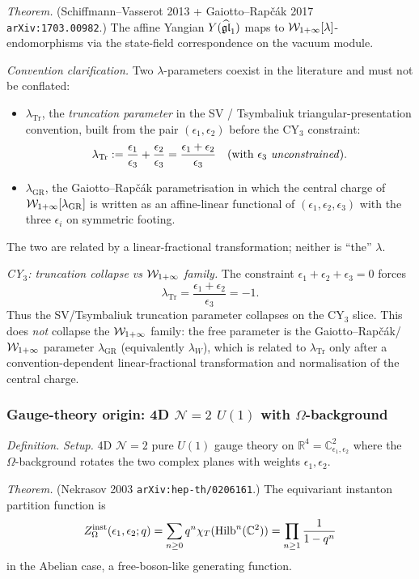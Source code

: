 \emph{Theorem.} (Schiffmann--Vasserot 2013 + Gaiotto--Rapčák 2017
\texttt{arXiv:1703.00982}.) The affine Yangian $Y(\widehat{\mathfrak{gl}}_1)$ maps to
$\mathcal{W}_{1+\infty}[\lambda]$-endomorphisms via the state-field correspondence on the
vacuum module.

\emph{Convention clarification.} Two $\lambda$-parameters coexist in the literature and
must not be conflated:
\begin{itemize}
\item $\lambda_{\mathrm{Tr}}$, the \emph{truncation parameter} in the SV / Tsymbaliuk
triangular-presentation convention, built from the pair $(\epsilon_1, \epsilon_2)$
before the CY$_3$ constraint:
\[
\lambda_{\mathrm{Tr}} := \frac{\epsilon_1}{\epsilon_3} + \frac{\epsilon_2}{\epsilon_3}
= \frac{\epsilon_1 + \epsilon_2}{\epsilon_3} \quad
\text{(with $\epsilon_3$ \emph{unconstrained})}.
\]
\item $\lambda_{\mathrm{GR}}$, the Gaiotto--Rap\v c\'ak parametrisation in which
the central charge of $\mathcal{W}_{1+\infty}[\lambda_{\mathrm{GR}}]$ is written as an affine-linear
functional of $(\epsilon_1, \epsilon_2, \epsilon_3)$ with the three $\epsilon_i$ on
symmetric footing.
\end{itemize}
The two are related by a linear-fractional transformation; neither is ``the'' $\lambda$.

\emph{CY$_3$: truncation collapse vs $\mathcal{W}_{1+\infty}$ family.} The constraint
$\epsilon_1+\epsilon_2+\epsilon_3=0$ forces
\[
\lambda_{\mathrm{Tr}}
=\frac{\epsilon_1+\epsilon_2}{\epsilon_3}
=-1.
\]
Thus the SV/Tsymbaliuk truncation parameter collapses on the CY$_3$ slice.
This does \emph{not} collapse the $\mathcal{W}_{1+\infty}$ family: the free parameter is
the Gaiotto--Rap\v c\'ak/$\mathcal{W}_{1+\infty}$ parameter
$\lambda_{\mathrm{GR}}$ (equivalently $\lambda_W$), which is related to
$\lambda_{\mathrm{Tr}}$ only after a convention-dependent
linear-fractional transformation and normalisation of the central charge.

\subsubsection{Gauge-theory origin: 4D $\mathcal{N} = 2$ $U(1)$ with $\Omega$-background}

\emph{Definition.} \emph{Setup.} 4D $\mathcal{N} = 2$ pure $U(1)$ gauge theory on
$\mathbb{R}^4 = \mathbb{C}^2_{\epsilon_1, \epsilon_2}$ where the $\Omega$-background
rotates the two complex planes with weights $\epsilon_1, \epsilon_2$.

\emph{Theorem.} (Nekrasov 2003 \texttt{arXiv:hep-th/0206161}.)
The equivariant instanton partition function is
\[
Z^{\mathrm{inst}}_{\Omega}(\epsilon_1, \epsilon_2; q) = \sum_{n \geq 0} q^n \chi_T(\mathrm{Hilb}^n(\mathbb{C}^2))
= \prod_{n \geq 1} \frac{1}{1 - q^n}
\]
in the Abelian case, a free-boson-like generating function.

